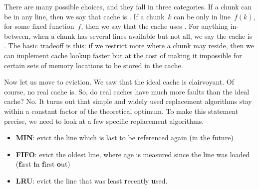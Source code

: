 There are many possible choices, and they fall in three categories.
If a chunk can be in any line, then we say that cache is .
If a chunk~$k$ can be only in line~$f(k)$, for some fixed function~$f$,
  then we say that the cache uses .
For anything in-between,
  when a chunk has several lines available but not all,
  we say the cache is .
The basic tradeoff is this:
  if we restrict more where a chunk may reside,
  then we can implement cache lookup faster
  but at the cost of making it impossible for certain sets of memory locations
    to be stored in the cache.

\smallskip

Now let us move to eviction.
We saw that the ideal cache is clairvoyant.
Of course, no real cache is.
So, do real caches have much more faults than the ideal cache?
No.
It turns out that simple and widely used replacement algorithms
  stay within a constant factor of the theoretical optimum.
To make this statement precise,
  we need to look at a few specific replacement algorithms.
\begin{itemize}
\item {\bf MIN}: evict the line which is last to be referenced again (in the future)
\item {\bf FIFO}: evict the oldest line,
  where age is measured since the line was loaded
  ({\bf f}irst {\bf i}n {\bf f}irst {\bf o}ut)
\item {\bf LRU}: evict the line that was {\bf l}east {\bf r}ecently {\bf u}sed.
\end{itemize}
